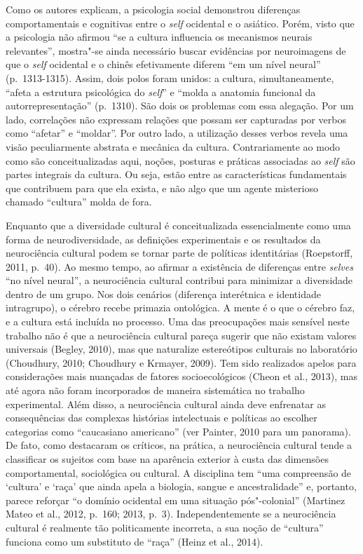 Como os autores explicam, a psicologia social demonstrou diferenças
comportamentais e cognitivas entre o \emph{self} ocidental e o asiático. Porém,
visto que a psicologia não afirmou ``se a cultura influencia os
mecanismos neurais relevantes'', mostra"-se ainda necessário buscar
evidências por neuroimagens de que o \emph{self} ocidental e o chinês
efetivamente diferem ``em um nível neural'' (p.~1313-1315). Assim, dois
polos foram unidos: a cultura, simultaneamente, ``afeta a estrutura
psicológica do \emph{self}'' e ``molda a anatomia funcional da
autorrepresentação'' (p.~1310). São dois os problemas com essa alegação.
Por um lado, correlações não expressam relações que possam ser
capturadas por verbos como ``afetar'' e ``moldar''. Por outro lado, a
utilização desses verbos revela uma visão peculiarmente abstrata e
mecânica da cultura. Contrariamente ao modo como são conceitualizadas
aqui, noções, posturas e práticas associadas ao \emph{self} são partes
integrais da cultura. Ou seja, estão entre as características
fundamentais que contribuem para que ela exista, e não algo que um
agente misterioso chamado ``cultura'' molda de fora.

Enquanto que a diversidade cultural é conceitualizada essencialmente
como uma forma de neurodiversidade, as definições experimentais e os
resultados da neurociência cultural podem se tornar parte de políticas
identitárias (Roepstorff, 2011, p.~40). Ao mesmo tempo, ao afirmar a
existência de diferenças entre \emph{selves} ``no nível neural'', a
neurociência cultural contribui para minimizar a diversidade dentro de
um grupo. Nos dois cenários (diferença interétnica e identidade
intragrupo), o cérebro recebe primazia ontológica. A mente é o que o
cérebro faz, e a cultura está incluída no processo. Uma das preocupações
mais sensível neste trabalho não é que a neurociência cultural pareça
sugerir que não existam valores universais (Begley, 2010), mas que
naturalize estereótipos culturais no laboratório (Choudhury, 2010;
Choudhury e Krmayer, 2009). Tem sido realizados apelos para
considerações mais nuançadas de fatores socioecológicos (Cheon et al.,
2013), mas até agora não foram incorporados de maneira sistemática no
trabalho experimental. Além disso, a neurociência cultural ainda deve
enfrenatar as consequências das complexas histórias intelectuais e
políticas ao escolher categorias como ``caucasiano americano'' (ver
Painter, 2010 para um panorama). De fato, como destacaram os críticos,
na prática, a neurociência cultural tende a classificar os sujeitos com
base na aparência exterior à custa das dimensões comportamental,
sociológica ou cultural. A disciplina tem ``uma compreensão de `cultura'
e `raça' que ainda apela a biologia, sangue e ancestralidade'' e,
portanto, parece reforçar ``o domínio ocidental em uma situação
pós"-colonial'' (Martinez Mateo et al., 2012, p.~160; 2013, p.~3).
Independentemente se a neurociência cultural é realmente tão
politicamente incorreta, a sua noção de ``cultura'' funciona como um
substituto de ``raça'' (Heinz et al., 2014).

